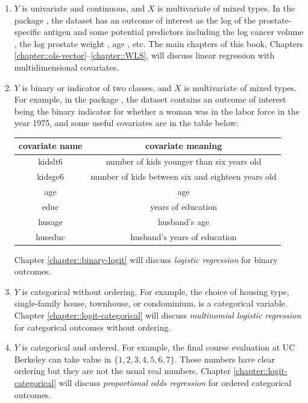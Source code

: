 \begin{enumerate}[label=(T\arabic*), ref=T\arabic*]
 
 
 
\item $Y$ is univariate and continuous, and $X$ is multivariate of mixed types.
In the  package , the dataset 
has an outcome of interest as the log of the prostate-specific antigen  and some potential predictors
including the log cancer volume , the log prostate weight , age , etc. 
The main chapters of this book, 
Chapters \ref{chapter::ols-vector}--\ref{chapter::WLS}, will discuss linear regression with multidimensional covariates.  
 


\item $Y$ is binary or indicator of two classes, and $X$ is multivariate of
mixed types. For example, in the  package , the dataset  contains
an outcome of interest being the binary indicator for whether a woman
was in the labor force in the year 1975, and some useful covariates are in the table below: 
\begin{center}
\begin{tabular}{|c|c|}
\hline 
covariate name & covariate meaning\tabularnewline
\hline 
\hline 
kidslt6 & number of kids younger than six years old\tabularnewline
\hline 
kidsge6 & number of kids between six and eighteen years old\tabularnewline
\hline 
age & age\tabularnewline
\hline 
educ & years of education\tabularnewline
\hline 
husage & husband's age\tabularnewline
\hline 
huseduc & husband's years of education\tabularnewline
\hline 
\end{tabular} 
\end{center}
Chapter \ref{chapter::binary-logit} will discuss {\it logistic regression} for binary outcomes. 


\item $Y$ is categorical without ordering. For example, the choice of housing type, single-family house, townhouse, or condominium, is a categorical variable. 
Chapter \ref{chapter::logit-categorical} will discuss {\it multinomial logistic regression} for categorical outcomes without ordering. 



\item $Y$ is categorical and ordered. For example, the final course evaluation at UC Berkeley can take value in $\{ 1,2,3,4,5,6,7 \}$. These numbers have clear ordering but they are not the usual real numbers. 
Chapter \ref{chapter::logit-categorical} will discuss {\it 
proportional odds regression} for ordered categorical outcomes. 




\end{enumerate}
